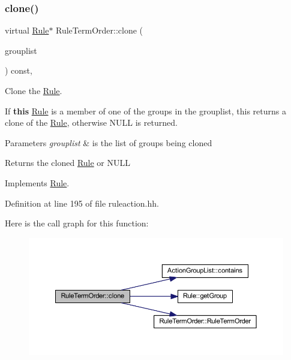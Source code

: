 \subsubsection{\texorpdfstring{clone()}{clone()}}
{\footnotesize\ttfamily virtual \mbox{\hyperlink{class_rule}{Rule}}$\ast$ Rule\+Term\+Order\+::clone (\begin{DoxyParamCaption}\item[{const \mbox{\hyperlink{class_action_group_list}{Action\+Group\+List}} \&}]{grouplist }\end{DoxyParamCaption}) const\hspace{0.3cm}{\ttfamily [inline]}, {\ttfamily [virtual]}}



Clone the \mbox{\hyperlink{class_rule}{Rule}}. 

If {\bfseries{this}} \mbox{\hyperlink{class_rule}{Rule}} is a member of one of the groups in the grouplist, this returns a clone of the \mbox{\hyperlink{class_rule}{Rule}}, otherwise N\+U\+LL is returned. 
\begin{DoxyParams}{Parameters}
{\em grouplist} & is the list of groups being cloned \\
\hline
\end{DoxyParams}
\begin{DoxyReturn}{Returns}
the cloned \mbox{\hyperlink{class_rule}{Rule}} or N\+U\+LL 
\end{DoxyReturn}


Implements \mbox{\hyperlink{class_rule_a70de90a76461bfa7ea0b575ce3c11e4d}{Rule}}.



Definition at line 195 of file ruleaction.\+hh.

Here is the call graph for this function\+:
\nopagebreak
\begin{figure}[H]
\begin{center}
\leavevmode
\includegraphics[width=350pt]{class_rule_term_order_a02f5abd73f44211860e5cdf7f6f9d554_cgraph}
\end{center}
\end{figure}
\mbox{\label{class_rule_term_order_a2d60614aa2007130a4520cc782f8fdc7}} 
